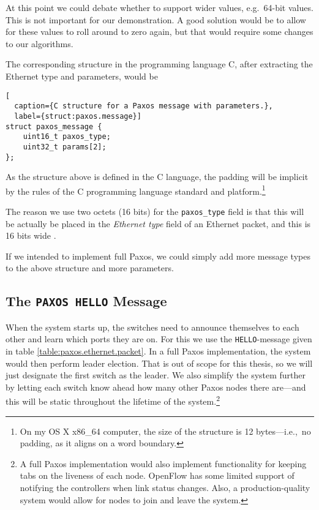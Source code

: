 At this point we
could debate whether to support wider values, e.g.~64-bit values.
This is not important for our demonstration.  A good solution would be to
allow for these values to roll around to zero again, but that would require
some changes to our algorithms.

The corresponding structure in the programming language C, after extracting
the Ethernet type and parameters, would be

\begin{lstlisting}[
  caption={C structure for a Paxos message with parameters.},
  label={struct:paxos.message}]
struct paxos_message {
    uint16_t paxos_type;
    uint32_t params[2];
};
\end{lstlisting}

As the structure above is defined in the C language, the padding will be
implicit by the rules of the C programming language standard and
platform.\footnote{On my OS X x86\_{}64 computer, the size of the structure
is 12 bytes---i.e.,~no padding, as it aligns on a word boundary.}

The reason we use two octets (16 bits) for the \texttt{paxos\_{}type} field
is that this will be actually be placed in the \textit{Ethernet type} field
of an Ethernet packet, and this is 16 bits wide \cite{IEEE.802.3}.

If we intended to implement full Paxos, we
could simply add more message types to the above structure and more
parameters.

\subsection{The \texttt{PAXOS HELLO} Message}

When the system starts up, the switches need to announce themselves to each
other and learn which ports they are on.  For this we use the
\texttt{HELLO}-message given in table \ref{table:paxos.ethernet.packet}.
In a full Paxos implementation, the system would then perform leader
election.  That is out of scope for this thesis, so we will just designate
the first switch as the leader.  We also simplify the system further by
letting each switch know ahead how many other Paxos nodes there are---and
this will be static throughout the lifetime of the system.\footnote{A full
Paxos implementation would also implement functionality for keeping tabs
on the liveness of each node.  OpenFlow has some limited support of
notifying the controllers when link status
changes.  Also, a
production-quality system would allow for nodes to join and leave the
system.}

